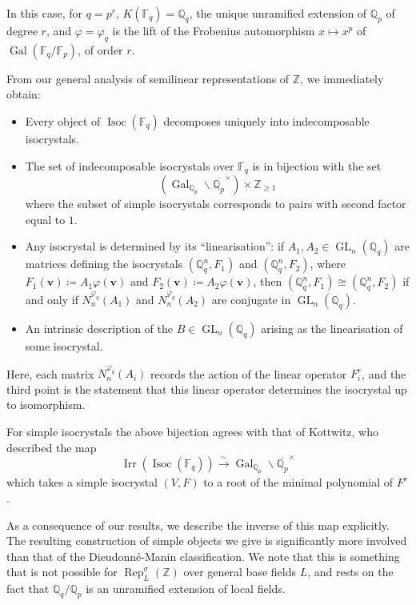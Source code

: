 \documentclass[10pt, reqno, hidelinks]{amsart}
\DeclareMathOperator{\Isoc}{Isoc}
\DeclareMathOperator{\Gal}{Gal}
\DeclareMathOperator{\Rep}{Rep}
\DeclareMathOperator{\Irr}{Irr}
\DeclareMathOperator{\GL}{GL}
\newcommand{\bF}{{\mathbb F}}
\newcommand{\bQ}{{\mathbb Q}}
\newcommand{\bZ}{{\mathbb Z}}
\numberwithin{thm}{subsection}
\theoremstyle{definition}
\begin{document}
In this case, for $q = p^r$, $K(\bF_q) = \bQ_q$, the unique unramified extension of $\bQ_p$ of degree $r$, and $\varphi = \varphi_q$ is the lift of the Frobenius automorphism $x \mapsto x^p$ of $\Gal(\bF_q / \bF_p)$, of order $r$.

From our general analysis of semilinear representations of $\bZ$, we immediately obtain: 
\begin{itemize}
	\item Every object of $\Isoc(\bF_q)$ decomposes uniquely into indecomposable isocrystals.
	\item The set of indecomposable isocrystals over $\bF_q$ is in bijection with the set
	\[
		\left(\Gal_{\bQ_p} \!\! \backslash \overline{\bQ_p}^{\times} \right) \times \bZ_{\geq 1}
	\]
	where the subset of simple isocrystals corresponds to pairs with second factor equal to $1$.
	\item Any isocrystal is determined by its ``linearisation'': if $A_1, A_2 \in \GL_n(\bQ_q)$ are matrices defining the isocrystals $(\bQ_q^{n}, F_1)$ and $(\bQ_q^{n}, F_2)$, where $F_1(\mathbf{v}) \coloneqq A_1 \varphi(\mathbf{v})$ and $F_2(\mathbf{v}) \coloneqq A_2 \varphi(\mathbf{v})$, then $(\bQ_q^{n}, F_1) \cong (\bQ_q^{n}, F_2)$ if and only if $N^{\varphi_q}_n(A_1)$ and $N^{\varphi_q}_n(A_2)$ are conjugate in $\GL_n(\bQ_q)$. 
	\item An intrinsic description of the $B \in \GL_n(\bQ_q)$ arising as the linearisation of some isocrystal.
\end{itemize}

Here, each matrix $N^{\varphi_q}_n(A_i)$ records the action of the linear operator $F_i^r$, and the third point is the statement that this linear operator determines the isocrystal up to isomorphism.

For simple isocrystals the above bijection agrees with that of Kottwitz, who described the map 
\[
\Irr(\Isoc(\bF_q)) \xrightarrow{\sim} \Gal_{\bQ_p} \!\! \backslash \overline{\bQ_p}^{\times}
\]
which takes a simple isocrystal $(V,F)$ to a root of the minimal polynomial of $F^r$ \cite[Lem.\ 11.2]{Kott}.

As a consequence of our results, we describe the inverse of this map explicitly. The resulting construction of simple objects we give is significantly more involved than that of the Dieudonn\'{e}-Manin classification. We note that this is something that is not possible for $\Rep_L^{\sigma}(\bZ)$ over general base fields $L$, and rests on the fact that $\bQ_q / \bQ_p$ is an unramified extension of local fields.
\end{document}
